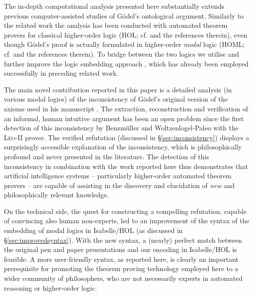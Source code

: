 \documentclass{article}
\begin{document}
The in-depth computational analysis presented here substantially
extends previous computer-assisted studies of G\"odel's ontological
argument. Similarly to the related work \cite{J30,C40} the analysis has
been conducted with automated theorem provers for classical
higher-order logic (HOL; cf. \cite{andrewsSEP} and the references
therein), even though G\"odel's proof is actually formulated in
higher-order \emph{modal} logic (HOML; cf. \cite{homl} and the
references therein). To bridge between the two logics we utilise and
further improve the logic embedding approach \cite{J23,C40}, which has
already been employed successfully in preceding related work.

The main novel contribution reported in this paper is a detailed
analysis (in various modal logics) of the inconsistency of G\"{o}del's
original version of the axioms used in his manuscript
. The extraction, reconstruction and
verification of an informal, human intuitive argument has been an open
problem since the first detection of this inconsistency by
Benzm\"uller and Woltzenlogel-Paleo  with the
\textsc{Leo-II} prover.  The verified refutation (discussed in
\S\ref{sec:inconsistency}) displays a surprisingly accessible
explanation of the inconsistency, which is philosophically profound
and never presented in the literature. The detection of this
inconsistency in combination with the work reported here thus
demonstrates that artificial intelligence systems -- particularly
higher-order automated theorem provers -- are capable of assisting in
the discovery and elucidation of \emph{new} and philosophically
relevant knowledge.

On the technical side, the quest for constructing a compelling
refutation, capable of convincing also human non-experts, led to an
improvement of the syntax of the embedding of modal logics in Isabelle/HOL
(as discussed in \S\ref{sec:improvedsyntax}). With the new syntax, a
(nearly) perfect match between the original pen and paper
presentations and our encoding in Isabelle/HOL is feasible. A more
user-friendly syntax, as reported here, is clearly an important
prerequisite for promoting the theorem proving technology employed
here to a wider community of philosophers, who are not necessarily
experts in automated reasoning or higher-order logic.
\end{document}
